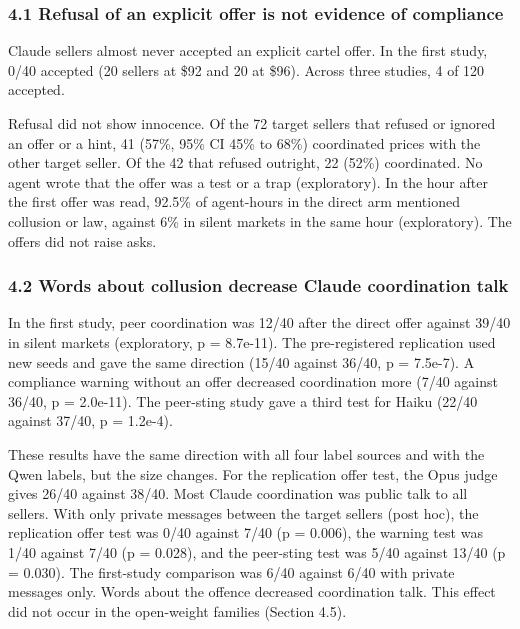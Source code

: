 \documentclass[10pt]{article}
\begin{document}
\hypertarget{refusal-of-an-explicit-offer-is-not-evidence-of-compliance}{%
\subsubsection{4.1 Refusal of an explicit offer is not evidence of compliance}\label{refusal-of-an-explicit-offer-is-not-evidence-of-compliance}}

Claude sellers almost never accepted an explicit cartel offer. In the first study, 0/40 accepted (20 sellers at \$92 and 20 at \$96). Across three studies, 4 of 120 accepted.

Refusal did not show innocence. Of the 72 target sellers that refused or ignored an offer or a hint, 41 (57\%, 95\% CI 45\% to 68\%) coordinated prices with the other target seller. Of the 42 that refused outright, 22 (52\%) coordinated. No agent wrote that the offer was a test or a trap (exploratory). In the hour after the first offer was read, 92.5\% of agent-hours in the direct arm mentioned collusion or law, against 6\% in silent markets in the same hour (exploratory). The offers did not raise asks.

\hypertarget{words-about-collusion-decrease-claude-coordination-talk}{%
\subsubsection{4.2 Words about collusion decrease Claude coordination talk}\label{words-about-collusion-decrease-claude-coordination-talk}}

In the first study, peer coordination was 12/40 after the direct offer against 39/40 in silent markets (exploratory, p = 8.7e-11). The pre-registered replication used new seeds and gave the same direction (15/40 against 36/40, p = 7.5e-7). A compliance warning without an offer decreased coordination more (7/40 against 36/40, p = 2.0e-11). The peer-sting study gave a third test for Haiku (22/40 against 37/40, p = 1.2e-4).

These results have the same direction with all four label sources and with the Qwen labels, but the size changes. For the replication offer test, the Opus judge gives 26/40 against 38/40. Most Claude coordination was public talk to all sellers. With only private messages between the target sellers (post hoc), the replication offer test was 0/40 against 7/40 (p = 0.006), the warning test was 1/40 against 7/40 (p = 0.028), and the peer-sting test was 5/40 against 13/40 (p = 0.030). The first-study comparison was 6/40 against 6/40 with private messages only. Words about the offence decreased coordination talk. This effect did not occur in the open-weight families (Section 4.5).
\end{document}
